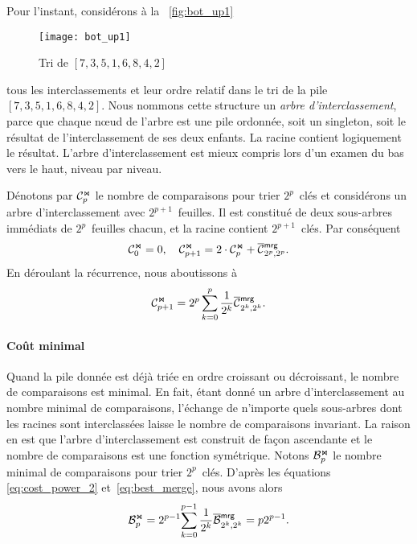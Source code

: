 Pour l'instant, considérons à la \fig~\vref{fig:bot_up1}
\begin{figure}
\centering
\texttt{[image: bot\_up1]}
\caption{Tri de \([7,3,5,1,6,8,4,2]\)}
\label{fig:bot_up1}
\end{figure}
tous les interclassements et leur ordre relatif dans le tri de la pile
\([7, 3, 5, 1, 6, 8, 4, 2]\). Nous nommons cette structure un
\emph{arbre d'interclassement}, parce que
chaque nœud de l'arbre est une pile ordonnée, soit un singleton,
soit le résultat de l'interclassement de ses deux enfants. La racine
contient logiquement le résultat. L'arbre d'interclassement est mieux
compris lors d'un examen du bas vers le haut, niveau par
niveau.

Dénotons par \(\mathcal{C}_{p}^{\Join}\) le nombre de comparaisons pour trier
\(2^p\)~clés et considérons un arbre d'interclassement avec
\(2^{p+1}\)~feuilles. Il est constitué de deux sous-arbres immédiats
de \(2^p\)~feuilles chacun, et la racine contient
\(2^{p+1}\)~clés. Par conséquent
\begin{equation*}
\C{\Join}{0} = 0,
\quad
\C{\Join}{p+1} = 2 \cdot \C{\Join}{p} + \OC{\fun{mrg}}{2^p,2^p}.
\end{equation*}
En déroulant la récurrence, nous aboutissons à
\begin{equation}
\C{\Join}{p+1}
  = 2^p\sum_{k=0}^p{\frac{1}{2^k}\OC{\fun{mrg}}{2^k,2^k}}.
\index{mrg@$\C{\Join}{n}$}
\label{eq:cost_power_2}
\end{equation}

\paragraph{Coût minimal}

Quand la pile donnée est déjà triée en ordre croissant ou décroissant,
le nombre de comparaisons est minimal. En fait, étant donné un arbre
d'interclassement au nombre minimal de comparaisons,
 l'échange de n'importe quels
sous-arbres dont les racines sont interclassées laisse le nombre de
comparaisons invariant. La raison en est que l'arbre d'interclassement
est construit de façon ascendante et le nombre de comparaisons est une
fonction symétrique.  Notons \(\mathcal{B}_{p}^{\Join}\) le nombre minimal de
comparaisons pour trier \(2^p\)~clés. D'après les équations
\eqref{eq:cost_power_2} et~\eqref{eq:best_merge}, nous avons alors
\begin{equation}
\B{\Join}{p}
  = 2^{p-1}\!\sum_{k=0}^{p-1}{\frac{1}{2^k}\OB{\fun{mrg}}{2^k,2^k}}
  = p2^{p-1}.\label{eq:best_power}\index{mrg@$\B{\Join}{n}$}
\end{equation}

